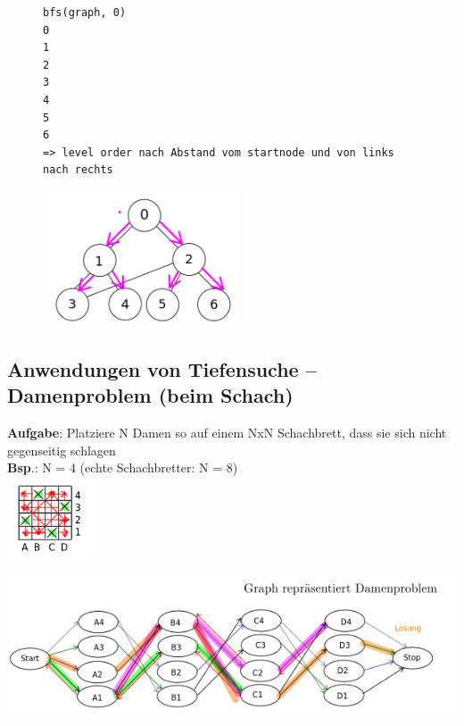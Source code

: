 \documentclass[11pt, fleqn]{scrreprt}
\begin{document}
    \begin{figure}[htbp]
        \begin{minipage}[t]{11cm}
        \vspace{0cm}
            \begin{verbatim}
bfs(graph, 0)
0
1
2
3
4
5
6
=> level order nach Abstand vom startnode und von links nach rechts
            \end{verbatim}
        \end{minipage}
        \begin{minipage}[t]{6cm}
        \vspace{0.0cm}
        \includegraphics[width=6cm,height=4cm,keepaspectratio]{./Pictures/BFS.png}
        \end{minipage}
    \end{figure}

\newpage
    \subsection*{Anwendungen von Tiefensuche – Damenproblem (beim Schach)}
    \textbf{Aufgabe}: Platziere N Damen so auf einem NxN Schachbrett, dass sie sich nicht gegenseitig schlagen\\

    \textbf{Bsp}.: N = 4 \hspace*{1cm}(echte Schachbretter: N = 8)\\ \includegraphics[width=2.5cm,height=2.5cm,keepaspectratio]{./Pictures/Damenbrett.png}\\
    \includegraphics[width=14cm,height=5cm,keepaspectratio]{./Pictures/Damengraph.png}\\
\end{document}
